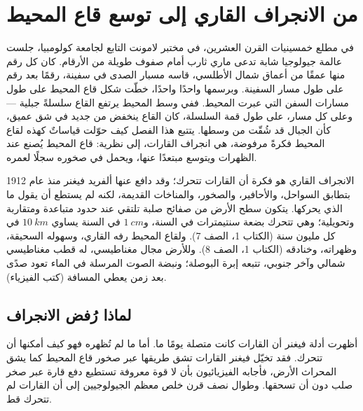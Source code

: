 \chapter{من الانجراف القاري إلى توسع قاع المحيط}\label{ch:g11:drift-to-spreading}

في مطلع خمسينيات القرن العشرين، في مختبر لامونت التابع لجامعة كولومبيا، جلست
عالمة جيولوجيا شابة تدعى ماري ثارب أمام صفوف طويلة من الأرقام. كان كل رقم منها عمقًا
من أعماق شمال الأطلسي، قاسه مسبار الصدى في سفينة، رقمًا بعد رقم على طول مسار
السفينة. وبرسمها واحدًا واحدًا، خطّت شكل قاع المحيط على طول مسارات السفن التي
عبرت المحيط. ففي وسط المحيط يرتفع القاع سلسلةً جبلية --- وعلى كل مسار، على طول
قمة السلسلة، كان القاع ينخفض من جديد في شق عميق، كأن الجبال قد شُقّت من
وسطها. يتتبع هذا الفصل كيف حوّلت قياساتٌ كهذه لقاع المحيط فكرةً مرفوضة، هي انجراف
القارات، إلى نظرية: قاع المحيط يُصنع عند الظهرات ويتوسع مبتعدًا عنها، ويحمل في
صخوره سجلًا لعمره.

\begin{recall}
الانجراف القاري هو فكرة أن القارات تتحرك؛ وقد دافع عنها ألفريد فيغنر منذ عام 1912
بتطابق السواحل، والأحافير، والصخور، والمناخات القديمة، لكنه لم يستطع أن يقول ما الذي
يحركها. يتكون سطح الأرض من صفائح صلبة تلتقي عند حدود متباعدة ومتقاربة
وتحويلية؛ وهي تتحرك بضعة سنتيمترات في السنة، و$\qty{1}{cm}$ في السنة يساوي $\qty{10}{km}$
في كل مليون سنة (الكتاب 1، الصف 7). ولقاع المحيط رفه
القاري، وسهوله السحيقة، وظهراته، وخنادقه (الكتاب 1، الصف 8).
وللأرض مجال مغناطيسي، له قطب مغناطيسي شمالي وآخر جنوبي، تتبعه إبرة
البوصلة؛ ونبضة الصوت المرسلة في الماء تعود صدًى
بعد زمن يعطي المسافة (كتب الفيزياء).
\end{recall}

\section{لماذا رُفض الانجراف}

أظهرت أدلة فيغنر أن القارات كانت متصلة يومًا ما. أما ما لم تُظهره فهو كيف أمكنها
أن تتحرك. فقد تخيّل فيغنر القارات تشق طريقها عبر صخور قاع المحيط كما يشق المحراث
الأرض، فأجابه الفيزيائيون بأن لا قوة معروفة تستطيع دفع قارة عبر صخر
صلب دون أن تسحقها. وطوال نصف قرن خلص معظم الجيولوجيين إلى أن
القارات لم تتحرك قط.

